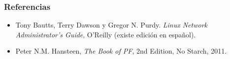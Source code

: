 \documentclass{beamer}
\begin{document}

\begin{frame}
\frametitle{Referencias}

\begin{itemize}
\item Tony Bautts, Terry Dawson y Gregor N. Purdy. \textit{Linux Network Administrator's Guide}, O'Reilly (existe edición en español).
\item Peter N.M. Hansteen, \textit{The Book of PF}, 2nd Edition, No Starch, 2011.
\end{itemize}

\end{frame}




\end{document}
